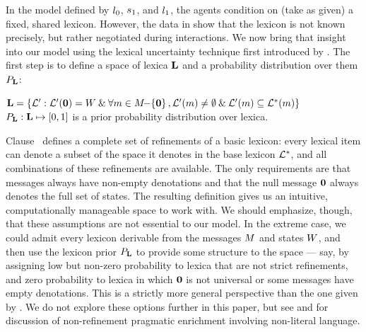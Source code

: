 \documentclass[12pt,twoside]{article}
\renewcommand{\_}{\textbf{\textunderscore\hspace{-4pt}\textunderscore\hspace{-3pt}\textunderscore\hspace{-4pt}\textunderscore}\hspace{0.5pt}}			%
\begin{document}
In the model defined by $l_{0}$, $s_{1}$, and
$l_{1}$, the agents condition on (take as given) a fixed,
shared lexicon. However, the data in  show that the
lexicon is not known precisely, but rather negotiated during
interactions. We now bring that insight into our model using the
lexical uncertainty technique first introduced by
\citet{Bergen:Goodman:Levy:2012,bergen-levy-goodman:2014}. The first
step is to define a space of lexica $\mathbf{L}$ and a probability
distribution over them $P_{\mathbf{L}}$:
%
\begin{exe}
\ex\label{model-extend}
  \begin{xlist} 
  \ex\label{lexset}%
      $\mathbf{L} = 
      \left\{ \mathcal{L}' : 
        \mathcal{L}'(\mathbf{0}) = W \mathbin{\&}
        \forall m \in M{\negthinspace-\negthinspace}\left\{ \mathbf{0} \right\}, 
        \mathcal{L}'(m) \neq \emptyset \mathbin{\&}
        \mathcal{L}'(m) \subseteq \mathcal{L}^{\ast}(m) \right\}$
  \ex\label{LexPrior}%
    $P_{\mathbf{L}} : \mathbf{L} \mapsto [0,1]$ is a prior
    probability distribution over lexica.  
  \end{xlist}
\end{exe}
%
Clause~ defines a complete set of
refinements of a basic lexicon: every lexical item can denote a subset
of the space it denotes in the base lexicon $\mathcal{L}^{\ast}$, and all
combinations of these refinements are available. The only requirements
are that messages always have non-empty denotations and that the null
message $\mathbf{0}$ always denotes the full set of states. The
resulting definition gives us an intuitive, computationally manageable
space to work with. We should emphasize, though, that these
assumptions are not essential to our model. In the extreme case, we
could admit every lexicon derivable from the messages $M$ and
states $W$, and then use the lexicon prior $P_{\mathbf{L}}$ to
provide some structure to the space --- say, by assigning low but
non-zero probability to lexica that are not strict refinements, and
zero probability to lexica in which $\mathbf{0}$ is not universal or
some messages have empty denotations. This is a strictly more general
perspective than the one given by . We do not explore
these options further in this paper, but see
\citealt{Kao:Bergen:Goodman:2014,Kao-etal:2014} and for discussion of
non-refinement pragmatic enrichment involving non-literal language.
\end{document}
